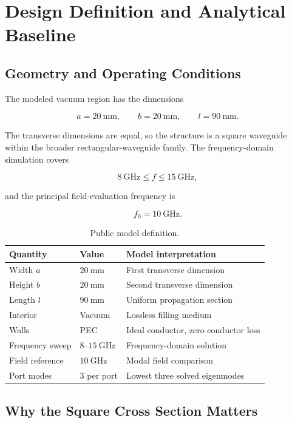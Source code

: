 \section{Design Definition and Analytical Baseline}
\label{sec:design-definition}

\subsection{Geometry and Operating Conditions}

The modeled vacuum region has the dimensions

\[
a = 20~\mathrm{mm},\qquad
b = 20~\mathrm{mm},\qquad
l = 90~\mathrm{mm}.
\]

The transverse dimensions are equal, so the structure is a square waveguide within the broader rectangular-waveguide family. The frequency-domain simulation covers

\[
8~\mathrm{GHz}\le f \le 15~\mathrm{GHz},
\]

and the principal field-evaluation frequency is

\[
f_0 = 10~\mathrm{GHz}.
\]

\begin{table}[H]
\centering
\caption{Public model definition.}
\label{tab:model-definition}
\begin{tabular}{@{}lll@{}}
\toprule
\textbf{Quantity} & \textbf{Value} & \textbf{Model interpretation} \\
\midrule
Width \(a\) & \(20~\mathrm{mm}\) & First transverse dimension \\
Height \(b\) & \(20~\mathrm{mm}\) & Second transverse dimension \\
Length \(l\) & \(90~\mathrm{mm}\) & Uniform propagation section \\
Interior & Vacuum & Lossless filling medium \\
Walls & PEC & Ideal conductor, zero conductor loss \\
Frequency sweep & \(8\)--\(15~\mathrm{GHz}\) & Frequency-domain solution \\
Field reference & \(10~\mathrm{GHz}\) & Modal field comparison \\
Port modes & 3 per port & Lowest three solved eigenmodes \\
\bottomrule
\end{tabular}
\end{table}

\subsection{Why the Square Cross Section Matters}

